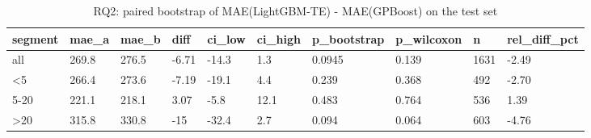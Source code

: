 \begin{table}
\caption{RQ2: paired bootstrap of MAE(LightGBM-TE) - MAE(GPBoost) on the test set}
\label{tab:rq2_comparison}
\begin{tabular}{llllllllll}
\toprule
segment & mae_a & mae_b & diff & ci_low & ci_high & p_bootstrap & p_wilcoxon & n & rel_diff_pct \\
\midrule
all & 269.8 & 276.5 & -6.71 & -14.3 & 1.3 & 0.0945 & 0.139 & 1631 & -2.49 \\
<5 & 266.4 & 273.6 & -7.19 & -19.1 & 4.4 & 0.239 & 0.368 & 492 & -2.70 \\
5-20 & 221.1 & 218.1 & 3.07 & -5.8 & 12.1 & 0.483 & 0.764 & 536 & 1.39 \\
>20 & 315.8 & 330.8 & -15 & -32.4 & 2.7 & 0.094 & 0.064 & 603 & -4.76 \\
\bottomrule
\end{tabular}
\end{table}

